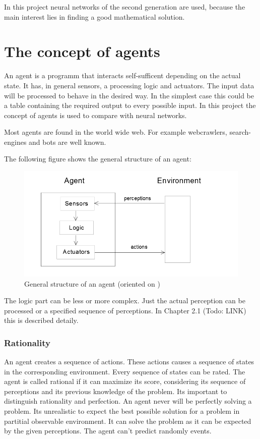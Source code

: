\documentclass[10pt,a4paper,DIV=11]{scrreprt}
\begin{document}
In this project neural networks of the second generation are used, because the main interest lies in finding a good mathematical solution.


\chapter{The concept of agents}
An agent is a programm that interacts self-sufficent depending on the actual state. It has, in general sensors, a processing logic and actuators. The input data will be processed to behave in the desired way. In the simplest case this could be a table containing the required output to every possible input. In this project the concept of agents is used to compare with neural networks.

Most agents are found in the world wide web. For example webcrawlers, search-engines and bots are well known.

The following figure shows the general structure of an agent:


\begin{center}
	\begin{figure}[H]
		\centering
		\includegraphics[width=1.0\textwidth,scale=1]{files/agent.png}  
		\caption{General structure of an agent (oriented on \cite{ki-book} )} 
		\label{fig:agent}
	\end{figure}
\end{center}

The logic part can be less or more complex. Just the actual perception can be processed or a specified sequence of perceptions. In Chapter 2.1 (Todo: LINK) this is described detaily.

\subsection{Rationality}
An agent creates a sequence of actions. These actions causes a sequence of states in the corresponding environment. Every sequence of states can be rated. The agent is called rational if it can maximize its score, considering its sequence of perceptions and its previous knowledge of the problem. Its important to distinguish rationality and perfection. An agent never will be perfectly solving a problem. Its unrealistic to expect the best possible solution for a problem in partitial observable environment. It can solve the problem as it can be expected by the given perceptions. The agent can't predict randomly events.
\end{document}
